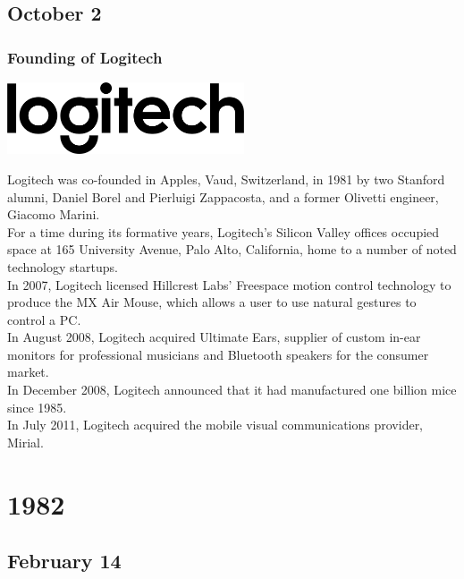 \documentclass[11pt]{report}
\begin{document}
\section{October 2}
\subsection{Founding of Logitech}
\vspace{2mm}\begin{center}\includegraphics[width=7cm]{./img/logitechLogo.jpg}\end{center}
Logitech was co-founded in Apples, Vaud, Switzerland, in 1981 by two Stanford alumni, Daniel Borel and Pierluigi Zappacosta, and a former Olivetti engineer, Giacomo Marini.\\
\indent For a time during its formative years, Logitech's Silicon Valley offices occupied space at 165 University Avenue, Palo Alto, California, home to a number of noted technology startups.\\
\indent In 2007, Logitech licensed Hillcrest Labs' Freespace motion control technology to produce the MX Air Mouse, which allows a user to use natural gestures to control a PC.\\
\indent In August 2008, Logitech acquired Ultimate Ears, supplier of custom in-ear monitors for professional musicians and Bluetooth speakers for the consumer market.\\
\indent In December 2008, Logitech announced that it had manufactured one billion mice since 1985.\\
\indent In July 2011, Logitech acquired the mobile visual communications provider, Mirial.\\

\chapter{1982}
\section{February 14}
\end{document}
